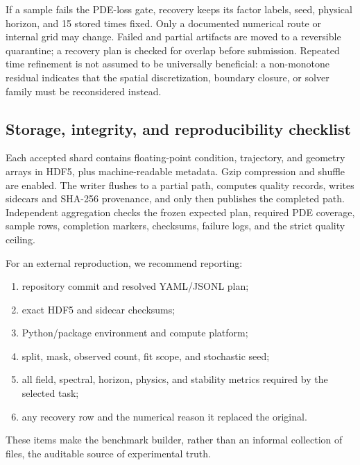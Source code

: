 \documentclass[10pt]{article}
\begin{document}
If a sample fails the PDE-loss gate, recovery keeps its factor labels, seed,
physical horizon, and 15 stored times fixed.  Only a documented numerical
route or internal grid may change.  Failed and partial artifacts are moved to a
reversible quarantine; a recovery plan is checked for overlap before
submission.  Repeated time refinement is not assumed to be universally
beneficial: a non-monotone residual indicates that the spatial discretization,
boundary closure, or solver family must be reconsidered instead.

\subsection{Storage, integrity, and reproducibility checklist}

Each accepted shard contains floating-point condition, trajectory, and
geometry arrays in HDF5, plus machine-readable metadata.  Gzip compression and
shuffle are enabled.  The writer flushes to a partial path, computes quality
records, writes sidecars and SHA-256 provenance, and only then publishes the
completed path.  Independent aggregation checks the frozen expected plan,
required PDE coverage, sample rows, completion markers, checksums, failure
logs, and the strict quality ceiling.

For an external reproduction, we recommend reporting:
\begin{enumerate}
  \item repository commit and resolved YAML/JSONL plan;
  \item exact HDF5 and sidecar checksums;
  \item Python/package environment and compute platform;
  \item split, mask, observed count, fit scope, and stochastic seed;
  \item all field, spectral, horizon, physics, and stability metrics required
  by the selected task;
  \item any recovery row and the numerical reason it replaced the original.
\end{enumerate}
These items make the benchmark builder, rather than an informal collection of
files, the auditable source of experimental truth.

\ifdefined\PDEOBSAPPENDIXINPUT
\else
\clearpage


\end{document}
